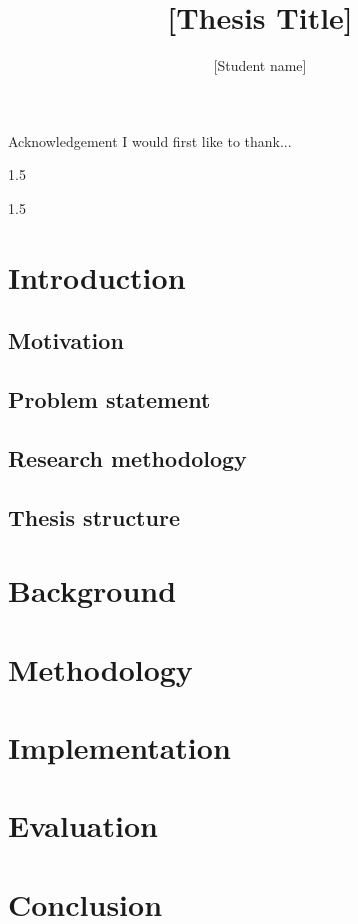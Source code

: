 \documentclass[11pt,a4paper]{report}
\title{[Thesis Title]}
\author{[Student name]}
\begin{document}
\maketitle



\begin{preface}{Acknowledgement}
I would first like to thank...
\end{preface}

\begin{abstract}

\end{abstract}

{
	\setlength{\baselineskip}%
			{1.5\baselineskip}
	\afterpreface
}

{
	\setlength{\baselineskip}%
			{1.5\baselineskip}
	\listoffigures
	\clearemptydoublepage
	\listoftables
	\clearemptydoublepage
	\listofalgorithms
	\clearemptydoublepage
}


\chapter{Introduction}
\section{Motivation}
\section{Problem statement}
\section{Research methodology}
\section{Thesis structure}

\chapter{Background}

\chapter{Methodology}

\chapter{Implementation}

\chapter{Evaluation}

\chapter{Conclusion}

% 



\end{document}
